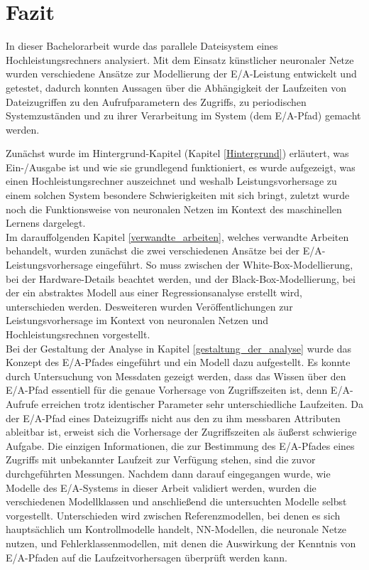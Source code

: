 \documentclass[
	12pt,
	a4paper,
	BCOR10mm,
	DIV14,
	listof=totoc,
	bibliography=totoc,
	headsepline
]{scrreprt}
\begin{document}
\chapter{Fazit}
\label{Fazit}
In dieser Bachelorarbeit wurde das parallele Dateisystem eines Hochleistungsrechners analysiert.
Mit dem Einsatz künstlicher neuronaler Netze wurden verschiedene Ansätze zur Modellierung der E/A-Leistung entwickelt und getestet, dadurch konnten Aussagen über die Abhängigkeit der Laufzeiten von Dateizugriffen zu den Aufrufparametern des Zugriffs, zu periodischen Systemzuständen und zu ihrer Verarbeitung im System (dem E/A-Pfad) gemacht werden.\medskip

Zunächst wurde im Hintergrund-Kapitel (Kapitel \ref{Hintergrund}) erläutert, was Ein-/Ausgabe ist und wie sie grundlegend funktioniert, es wurde aufgezeigt, was einen Hochleistungsrechner auszeichnet und weshalb Leistungsvorhersage zu einem solchen System besondere Schwierigkeiten mit sich bringt, zuletzt wurde noch die Funktionsweise von neuronalen Netzen im Kontext des maschinellen Lernens dargelegt.\\
Im darauffolgenden Kapitel \ref{verwandte_arbeiten}, welches verwandte Arbeiten behandelt, wurden zunächst die zwei verschiedenen Ansätze bei der E/A-Leistungsvorhersage eingeführt. So muss zwischen der White-Box-Modellierung, bei der Hardware-Details beachtet werden, und der Black-Box-Modellierung, bei der ein abstraktes Modell aus einer Regressionsanalyse erstellt wird, unterschieden werden. Desweiteren wurden Veröffentlichungen zur Leistungsvorhersage im Kontext von neuronalen Netzen und Hochleistungsrechnen vorgestellt.\\
Bei der Gestaltung der Analyse in Kapitel \ref{gestaltung_der_analyse} wurde das Konzept des E/A-Pfades eingeführt und ein Modell dazu aufgestellt. Es konnte durch Untersuchung von Messdaten gezeigt werden, dass das Wissen über den E/A-Pfad essentiell für die genaue Vorhersage von Zugriffszeiten ist, denn E/A-Aufrufe erreichen trotz identischer Parameter sehr unterschiedliche Laufzeiten.
Da der E/A-Pfad eines Dateizugriffs nicht aus den zu ihm messbaren Attributen ableitbar ist, erweist sich die Vorhersage der Zugriffszeiten als äußerst schwierige Aufgabe. Die einzigen Informationen, die zur Bestimmung des E/A-Pfades eines Zugriffs mit unbekannter Laufzeit zur Verfügung stehen, sind die zuvor durchgeführten Messungen.
Nachdem dann darauf eingegangen wurde, wie Modelle des E/A-Systems in dieser Arbeit validiert werden, wurden die verschiedenen Modellklassen und anschließend die untersuchten Modelle selbst vorgestellt. Unterschieden wird zwischen Referenzmodellen, bei denen es sich hauptsächlich um Kontrollmodelle handelt, NN-Modellen, die neuronale Netze nutzen, und Fehlerklassenmodellen, mit denen die Auswirkung der Kenntnis von E/A-Pfaden auf die Laufzeitvorhersagen überprüft werden kann.
\end{document}
